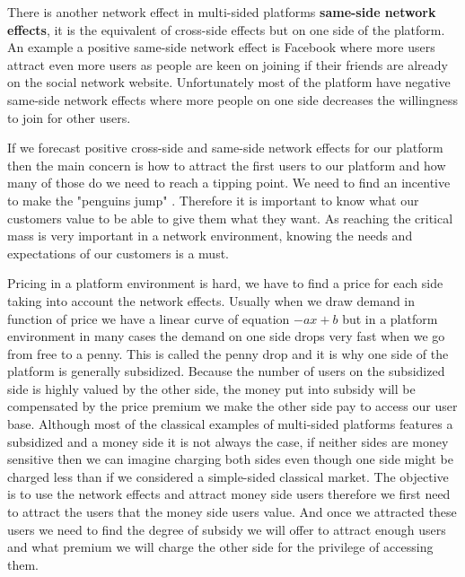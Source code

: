 \documentclass[10pt]{report}
\begin{document}
There is another network effect in multi-sided platforms \textbf{same-side network effects}, it is the equivalent of cross-side effects but on one side of the platform. An example a positive same-side network effect is Facebook where more users attract even more users as people are keen on joining if their friends are already on the social network website. Unfortunately most of the platform have negative same-side network effects where more people on one side decreases the willingness to join for other users.

If we forecast positive cross-side and same-side network effects for our platform then the main concern is how to attract the first users to our platform and how many of those do we need to reach a tipping point. We need to find an incentive to make the "penguins jump" \autocite{coursKyle}. Therefore it is important to know what our customers value to be able to give them what they want. As reaching the critical mass is very important in a network environment, knowing the needs and expectations of our customers is a must. 

Pricing in a platform environment is hard, we have to find a price for each side taking into account the network effects. Usually when we draw demand in function of price we have a linear curve of equation $-ax + b$ but in a platform environment in many cases the demand on one side drops very fast when we go from free to a penny. This is called the penny drop and it is why one side of the platform is generally subsidized. Because the number of users on the subsidized side is highly valued by the other side, the money put into subsidy will be compensated by the price premium we make the other side pay to access our user base. Although most of the classical examples of multi-sided platforms features a subsidized and a money side it is not always the case, if neither sides are money sensitive then we can imagine charging both sides even though one side might be charged less than if we considered a simple-sided classical market.
The objective is to use the network effects and attract money side users therefore we first need to attract the users that the money side users value. And once we attracted these users we need to find the degree of subsidy we will offer to attract enough users and what premium we will charge the other side for the privilege of accessing them. \autocite{rochet2003platform}
\end{document}
